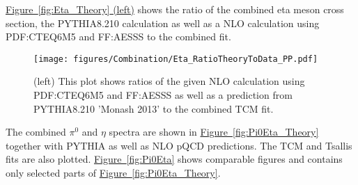 \hyperref[fig:Eta_Theory]{Figure~\ref*{fig:Eta_Theory} (left)} shows the ratio of the combined eta meson cross section, the PYTHIA8.210 calculation as well as a NLO calculation using \acs{PDF}:CTEQ6M5 and \acs{FF}:AESSS to the combined fit.
%
%
%
%
 		\begin{figure}[h]
 			\centering
 			\texttt{[image: figures/Combination/Eta\_RatioTheoryToData\_PP.pdf]}
 			\caption{\newline (left) This plot shows ratios of the given NLO calculation using \acs{PDF}:CTEQ6M5 and \acs{FF}:AESSS as well as a prediction from PYTHIA8.210 'Monash 2013' to the combined \acs{TCM} fit.}
 			\label{fig:Eta_Theory}
 			\label{fig:EtaToPi0_Theory}
 		\end{figure}
%
%
%
%
  The combined $\pi^0$ and $\eta$ spectra are shown in \hyperref[fig:Pi0Eta_Theory]{Figure~\ref*{fig:Pi0Eta_Theory}} together with PYTHIA as well as NLO pQCD predictions. The TCM and Tsallis fits are also plotted. \hyperref[fig:Pi0Eta]{Figure~\ref*{fig:Pi0Eta}} shows comparable figures and contains only selected parts of \hyperref[fig:Pi0Eta_Theory]{Figure~\ref*{fig:Pi0Eta_Theory}}.

